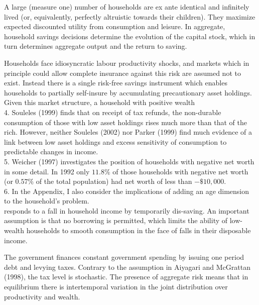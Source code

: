 \documentclass[11pt]{article}
\begin{document}
A large (measure one) number of households are ex ante identical and infinitely lived (or, equivalently, perfectly altruistic towards their children). They maximize expected discounted utility from consumption and leisure. In aggregate, household savings decisions determine the evolution of the capital stock, which in turn determines aggregate output and the return to saving.

Households face idiosyncratic labour productivity shocks, and markets which in principle could allow complete insurance against this risk are assumed not to exist. Instead there is a single risk-free savings instrument which enables households to partially self-insure by accumulating precautionary asset holdings. Given this market structure, a household with positive wealth\\
4. Souleles (1999) finds that on receipt of tax refunds, the non-durable consumption of those with low asset holdings rises much more than that of the rich. However, neither Souleles (2002) nor Parker (1999) find much evidence of a link between low asset holdings and excess sensitivity of consumption to predictable changes in income.\\
5. Weicher (1997) investigates the position of households with negative net worth in some detail. In 1992 only $11.8 \%$ of those households with negative net worth (or $0.57 \%$ of the total population) had net worth of less than $-\$ 10,000$.\\
6. In the Appendix, I also consider the implications of adding an age dimension to the household's problem.\\
responds to a fall in household income by temporarily dis-saving. An important assumption is that no borrowing is permitted, which limits the ability of low-wealth households to smooth consumption in the face of falls in their disposable income.

The government finances constant government spending by issuing one period debt and levying taxes. Contrary to the assumption in Aiyagari and McGrattan (1998), the tax level is stochastic. The presence of aggregate risk means that in equilibrium there is intertemporal variation in the joint distribution over productivity and wealth.
\end{document}
